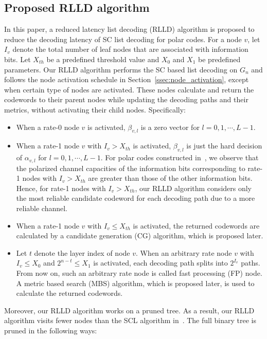 \documentclass[journal]{IEEEtran}
\begin{document}
\subsection{Proposed RLLD algorithm}
In this paper, a reduced latency list decoding (RLLD) algorithm is proposed to reduce the decoding latency of SC list decoding for polar codes. For a node $v$, let $I_v$ denote the total number of leaf nodes that are associated with information bits. Let $X_{th}$ be a predefined threshold value and $X_0$ and $X_1$ be predefined parameters. Our RLLD algorithm performs the SC based list decoding on $G_n$ and follows the node activation schedule in Section~\ref{ssec:node_activation}, except when certain type of nodes are activated. These nodes calculate and return the codewords to their parent nodes while updating the decoding paths and their metrics, without activating their child nodes. Specifically:
\begin{itemize}
\item When a rate-0 node $v$ is activated, $\beta_{v,l}$ is a zero vector for $l=0,1,\cdots,L-1$.
\item When a rate-1 node $v$ with $I_v>X_{th}$ is activated, $\beta_{v,l}$ is just the hard decision of $\alpha_{v,l}$ for $l=0,1,\cdots,L-1$. For polar codes constructed in~\cite{arikan_code_construct, tal_code_construct}, we observe that the polarized channel capacities of the information bits corresponding to rate-1 nodes with $I_v> X_{th}$ are greater than those of the other information bits. Hence, for rate-1 nodes with $I_v> X_{th}$, our RLLD algorithm considers only the most reliable candidate codeword for each decoding path due to a more reliable channel.
\item When a rate-1 node $v$ with $I_v\leqslant X_{th}$ is activated, the returned codewords are calculated by a candidate generation (CG) algorithm, which is proposed later.
\item Let $t$ denote the layer index of node $v$. When an arbitrary rate node $v$ with $I_v\leqslant X_0$ and $2^{n-t} \leqslant X_1$ is activated, each decoding path splits into $2^{I_v}$ paths. From now on, such an arbitrary rate node is called fast processing (FP) node. A metric based search (MBS) algorithm, which is proposed later, is used to calculate the returned codewords.
\end{itemize}
Moreover, our RLLD algorithm works on a pruned tree. As a result, our RLLD algorithm visits fewer nodes than the SCL algorithm in~\cite{ido_it, tree_list_dec}. The full binary tree is pruned in the following ways:
\end{document}
